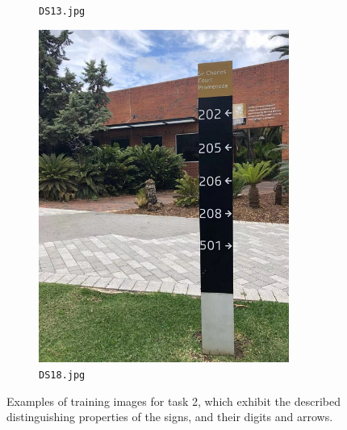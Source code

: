 \documentclass{article}
\begin{document}
\begin{figure}[h]
\begin{subfigure}[t]{0.22\textwidth}
    \caption[DS13]{
      \lstinline{DS13.jpg}
    }
    \label{fig:ds13}
  \end{subfigure}
  \begin{subfigure}[t]{0.22\textwidth}
    \centering
    \includegraphics[width=0.9\textwidth]{../train/task2/DS18}
    \caption[DS18]{
      \lstinline{DS18.jpg}
    }
    \label{fig:ds18}
  \end{subfigure}

  \caption[Task 2 - Regular Cases]{
    Examples of training images for task 2, which exhibit the described
    distinguishing properties of the signs, and their digits and arrows.
  }
  \label{fig:problem-2-regular}
\end{figure}
\end{document}
